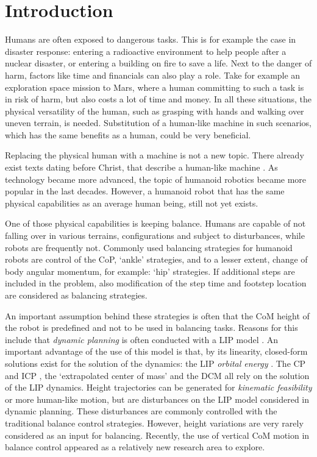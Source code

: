 %
\chapter{Introduction} \label{chap::intro}
Humans are often exposed to dangerous tasks. This is for example the case in disaster response: entering a radioactive environment to help people after a nuclear disaster, or entering a building on fire to save a life. Next to the danger of harm, factors like time and financials can also play a role. Take for example an exploration space mission to Mars, where a human committing to such a task is in risk of harm, but also costs a lot of time and money. In all these situations, the physical versatility of the human, such as grasping with hands and walking over uneven terrain, is needed. Substitution of a human-like machine in such scenarios, which has the same benefits as a human, could be very beneficial. 

Replacing the physical human with a machine is not a new topic. There already exist texts dating before Christ, that describe a human-like machine \cite{behnke2008humanoid}. As technology became more advanced, the topic of humanoid robotics became more popular in the last decades. However, a humanoid robot that has the same physical capabilities as an average human being, still not yet exists. 

One of those physical capabilities is keeping balance. Humans are capable of not falling over in various terrains, configurations and subject to disturbances, while robots are frequently not. Commonly used balancing strategies for humanoid robots are control of the \ac{CoP}, `ankle' strategies, and to a lesser extent, change of body angular momentum, for example: `hip' strategies. If additional steps are included in the problem, also modification of the step time and footstep location are considered as balancing strategies. 

An important assumption behind these strategies is often that the \ac{CoM} height of the robot is predefined and not to be used in balancing tasks. Reasons for this include that \textit{dynamic planning} is often conducted with a \ac{LIP} model \cite{kajita20013d}. An important advantage of the use of this model is that, by its linearity, closed-form solutions exist for the solution of the dynamics: the \ac{LIP} \textit{orbital energy} \cite{kajita1992dynamic}. The \ac{CP} \cite{pratt2006capture} and \ac{ICP} \cite{koolen2012capturability}, the `extrapolated center of mass' \cite{hof2008extrapolated} and the \ac{DCM} \cite{takenaka2009real} all rely on the solution of the \ac{LIP} dynamics. Height trajectories can be generated for \textit{kinematic feasibility} or more human-like motion, but are disturbances on the \ac{LIP} model considered in dynamic planning. These disturbances are commonly controlled with the traditional balance control strategies. However, height variations are very rarely considered as an input for balancing. Recently, the use of vertical \ac{CoM} motion in balance control appeared as a relatively new research area to explore.

